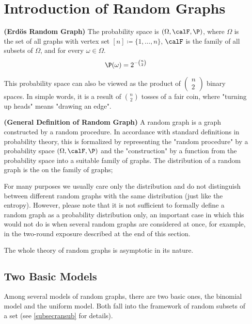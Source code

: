 \documentclass{article}
\newcommand{\bfs}[1]{\textbf{({#1}) }}
\begin{document}
\section{Introduction of Random Graphs}
\begin{defa}{\bfs{Erd\"{o}s Random Graph}}\label{deferdos}
The probability space is $(\Omega, \calF , \P )$, where $\Omega$ is the set of all graphs with vertex set $[n]\coloneqq\{1,\ldots,n\}$, $\calF$ is the family of all subsets of $\Omega$, and for every $\omega \in \Omega$.
\begin{align*}
\P (\omega)=2^{-\binom{n}{2}}
\end{align*}
\end{defa}
\begin{rema}
This probability space can also be viewed as the product of $\left(\begin{array}{l}n \\ 2\end{array}\right)$ binary spaces. In simple words, it is a result of $\binom{n}{2}$  tosses of a fair coin, where "turning up heads" means "drawing an edge".
\end{rema}
\begin{defa}{\bfs{General Definition of Random Graph}}\label{def:gera}
A random graph is a graph constructed by a random procedure. In accordance with standard definitions in probability theory, this is formalized by representing the "random procedure" by a probability space $(\Omega, \calF , \P )$ and the "construction" by a function from the probability space into a suitable family of graphs. The distribution of a random graph is the  on the family of graphs;
\end{defa}  
\begin{rema}
For many purposes we usually care only the distribution and do not distinguish between different random graphs with the same distribution (just like the entropy). However, please note that it is not sufficient to formally define a random graph as a probability distribution only, an important case in which this would not do is when several random graphs are considered at once, for example, in the two-round exposure described at the end of this section.
\end{rema} 
\begin{rema}
The whole theory of random graphs is  asymptotic in its nature.
\end{rema}
\subsection{Two Basic Models}
Among several models of random graphs, there are two basic ones, the binomial model and the uniform model. Both fall into the framework of random subsets of a set (see \cref{subsecransub} for details).
\end{document}
